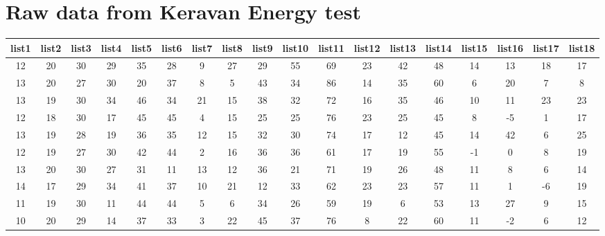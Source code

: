 \chapter{Raw data from Keravan Energy test}\label{appx:fifth}


\begin{sidewaystable}
    \centering
    \begin{tabular}{cccccccccccccccccc}
    list1 & list2 & list3 & list4 & list5 & list6 & list7 & list8 & list9 & list10 & list11 & list12 & list13 & list14 & list15 & list16 & list17 & list18 \\ \hline
    12    & 20    & 30    & 29    & 35    & 28    & 9     & 27    & 29    & 55     & 69     & 23     & 42     & 48     & 14     & 13     & 18     & 17     \\
    13    & 20    & 27    & 30    & 20    & 37    & 8     & 5     & 43    & 34     & 86     & 14     & 35     & 60     & 6      & 20     & 7      & 8      \\
    13    & 19    & 30    & 34    & 46    & 34    & 21    & 15    & 38    & 32     & 72     & 16     & 35     & 46     & 10     & 11     & 23     & 23     \\
    12    & 18    & 30    & 17    & 45    & 45    & 4     & 15    & 25    & 25     & 76     & 23     & 25     & 45     & 8      & -5     & 1      & 17     \\
    13    & 19    & 28    & 19    & 36    & 35    & 12    & 15    & 32    & 30     & 74     & 17     & 12     & 45     & 14     & 42     & 6      & 25     \\
    12    & 19    & 27    & 30    & 42    & 44    & 2     & 16    & 36    & 36     & 61     & 17     & 19     & 55     & -1     & 0      & 8      & 19     \\
    13    & 20    & 30    & 27    & 31    & 11    & 13    & 12    & 36    & 21     & 71     & 19     & 26     & 48     & 11     & 8      & 6      & 14     \\
    14    & 17    & 29    & 34    & 41    & 37    & 10    & 21    & 12    & 33     & 62     & 23     & 23     & 57     & 11     & 1      & -6     & 19     \\
    11    & 19    & 30    & 11    & 44    & 44    & 5     & 6     & 34    & 26     & 59     & 19     & 6      & 53     & 13     & 27     & 9      & 15     \\
    10    & 20    & 29    & 14    & 37    & 33    & 3     & 22    & 45    & 37     & 76     & 8      & 22     & 60     & 11     & -2     & 6      & 12     \\

\end{tabular}
\end{sidewaystable}
